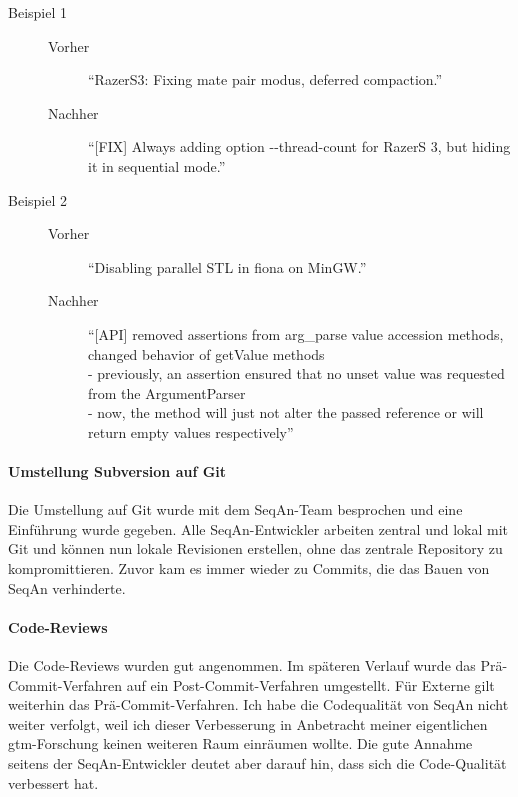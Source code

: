 \begin{description}
  \item[Beispiel 1] \hfill
  \begin{description}
    \item[Vorher] ``RazerS3: Fixing mate pair modus, deferred compaction.''
    \item[Nachher] ``[FIX] Always adding option -{}-thread-count for RazerS 3, but hiding it in sequential mode.''
  \end{description}
  
  \item[Beispiel 2] \hfill
  \begin{description}
    \item[Vorher] ``Disabling parallel STL in fiona on MinGW.''
    \item[Nachher] ``[API] removed assertions from arg\_parse value accession methods, changed behavior of getValue methods\\
- previously, an assertion ensured that no unset value was requested from the ArgumentParser\\
- now, the method will just not alter the passed reference or will return empty values respectively''
  \end{description}
\end{description}

\paragraph{Umstellung Subversion auf Git}

Die Umstellung auf Git wurde mit dem SeqAn-Team besprochen und eine Einführung wurde gegeben. Alle SeqAn-Entwickler arbeiten zentral und lokal mit Git und können nun lokale Revisionen erstellen, ohne das zentrale Repository zu kompromittieren. Zuvor kam es immer wieder zu Commits, die das Bauen von SeqAn verhinderte.

\paragraph{Code-Reviews}

Die Code-Reviews wurden gut angenommen. Im späteren Verlauf wurde das Prä-Commit-Verfahren auf ein Post-Commit-Verfahren umgestellt. Für Externe gilt weiterhin das Prä-Commit-Verfahren. Ich habe die Codequalität von SeqAn nicht weiter verfolgt, weil ich dieser Verbesserung in Anbetracht meiner eigentlichen \gls{gtm}-Forschung keinen weiteren Raum einräumen wollte. Die gute Annahme seitens der SeqAn-Entwickler deutet aber darauf hin, dass sich die Code-Qualität verbessert hat.


